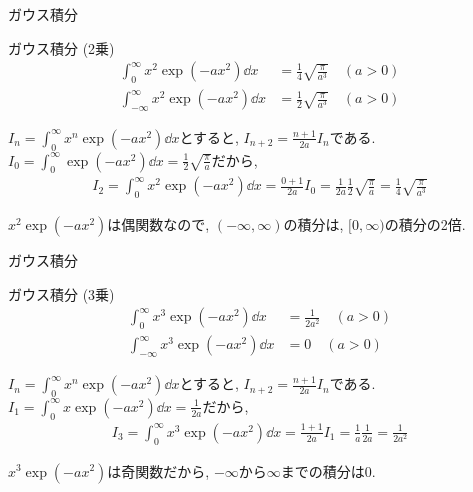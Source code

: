\documentclass[dvipdfmx,notheorems,t]{beamer}
\begin{document}
\begin{frame}{ガウス積分}
\begin{block}{ガウス積分 (2乗)}
  \begin{align*}
    \int_0^\infty x^2 \exp \left( -a x^2 \right) \dd{x}
      &= \frac{1}{4} \sqrt{\frac{\pi}{a^3}} \quad (a > 0) \\
    \int_{-\infty}^\infty x^2 \exp \left( -a x^2 \right) \dd{x}
      &= \frac{1}{2} \sqrt{\frac{\pi}{a^3}} \quad (a > 0)
  \end{align*}
\end{block}

$I_n = \int_0^\infty x^n \exp \left( -a x^2 \right) \dd{x}$とすると,
$I_{n + 2} = \frac{n + 1}{2a} I_n$である.
$I_0 = \int_0^\infty \exp \left( -a x^2 \right) \dd{x} = \frac{1}{2} \sqrt{\frac{\pi}{a}}$だから,
\begin{align*}
  I_2 = \int_0^\infty x^2 \exp \left( -a x^2 \right) \dd{x}
    = \frac{0 + 1}{2a} I_0
    = \frac{1}{2a} \frac{1}{2} \sqrt{\frac{\pi}{a}}
    = \frac{1}{4} \sqrt{\frac{\pi}{a^3}}
\end{align*}

$x^2 \exp \left( -a x^2 \right)$は偶関数なので, $(-\infty, \infty)$の積分は, $[0, \infty)$の積分の2倍.
\end{frame}

\begin{frame}{ガウス積分}
\begin{block}{ガウス積分 (3乗)}
  \begin{align*}
    \int_0^\infty x^3 \exp \left( -a x^2 \right) \dd{x}
      &= \frac{1}{2 a^2} \quad (a > 0) \\
    \int_{-\infty}^\infty x^3 \exp \left( -a x^2 \right) \dd{x}
      &= 0 \quad (a > 0)
  \end{align*}
\end{block}

$I_n = \int_0^\infty x^n \exp \left( -a x^2 \right) \dd{x}$とすると,
$I_{n + 2} = \frac{n + 1}{2a} I_n$である.
$I_1 = \int_0^\infty x \exp \left( -a x^2 \right) \dd{x} = \frac{1}{2a}$だから,
\begin{align*}
  I_3 = \int_0^\infty x^3 \exp \left( -a x^2 \right) \dd{x}
    = \frac{1 + 1}{2a} I_1
    = \frac{1}{a} \frac{1}{2a} = \frac{1}{2 a^2}
\end{align*}

$x^3 \exp \left( -a x^2 \right)$は奇関数だから, $-\infty$から$\infty$までの積分は$0$.
\end{frame}
\end{document}
